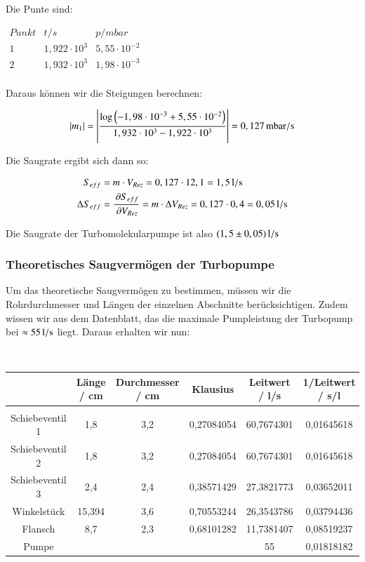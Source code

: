 Die Punte sind:

\begin{center}
	$
	\begin{matrix}
	Punkt	& t/s & p/mbar \\ 
	1	& 1,922 \cdot 10^{3} & 5,55 \cdot 10^{-2} \\ 
	2	& 1,932 \cdot 10^{3} & 1,98 \cdot 10^{-3} \\ 
	
	\end{matrix} 
	$	
\end{center}


Daraus können wir die Steigungen berechnen:

\begin{align*}
|m_1| &= \left| \frac{\log \left( -1,98 \cdot 10^{-3} + 5,55 \cdot 10^{-2} \right)}{1,932 \cdot 10^{3} - 1,922 \cdot 10^{3}} \right| = \unit[0,127]{mbar/s} \\
\end{align*}

Die Saugrate ergibt sich dann so:

\begin{align*}
S_{eff} &= m \cdot V_{Rez} = 0,127 \cdot 12,1 = \unit[1,5]{l/s} \\
\Delta S_{eff} &= \frac{\p S_{eff}}{\p V_{Rez}} = m \cdot \Delta V_{Rez} = 0,127 \cdot 0,4 = \unit[0,05]{l/s}
\end{align*}


Die Saugrate der Turbomolekularpumpe ist also $\unit[(1,5 \pm 0,05)]{l/s}$



\subsubsection*{Theoretisches Saugvermögen der Turbopumpe}

Um das theoretische Saugvermögen zu bestimmen, müssen wir die Rohrdurchmesser und Längen der einzelnen Abschnitte berücksichtigen. Zudem wissen wir aus dem Datenblatt, das die maximale Pumpleistung der Turbopump bei $\approx \unit[55]{l/s}$ liegt. Daraus erhalten wir nun:

\hfill \\

\begin{tabular}{c|c|c|c|c|c}
	& Länge / cm & Durchmesser / cm & Klausius & Leitwert / l/s & 1/Leitwert / s/l \\
	\hline 
	&      &      &      &      &  \\
	Schiebeventil 1 & 1,8  & 3,2  & 0,27084054 & 60,7674301 & 0,01645618 \\
	Schiebeventil 2 & 1,8  & 3,2  & 0,27084054 & 60,7674301 & 0,01645618 \\
	Schiebeventil 3 & 2,4  & 2,4  & 0,38571429 & 27,3821773 & 0,03652011 \\
	Winkelstück & 15,394 & 3,6  & 0,70553244 & 26,3543786 & 0,03794436 \\
	Flansch & 8,7  & 2,3  & 0,68101282 & 11,7381407 & 0,08519237 \\
	Pumpe &      &      &      & 55   & 0,01818182 \\
\end{tabular}

